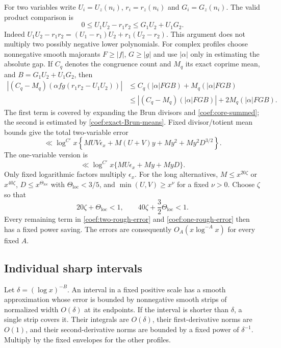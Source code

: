 For two variables write $U_i=U_z(n_i)$, $r_i=r_z(n_i)$ and
$G_i=G_z(n_i)$.  The valid product comparison is
\begin{equation}
 0\le U_1U_2-r_1r_2\le G_1U_2+U_1G_2.
 \label{coef:rough-product-gap}
\end{equation}
Indeed $U_1U_2-r_1r_2=(U_1-r_1)U_2+r_1(U_2-r_2)$.
This argument does not multiply two possibly negative lower polynomials.
For complex profiles choose nonnegative smooth majorants $F\ge|f|$,
$G\ge|g|$ and use $|\alpha|$ only in estimating the absolute gap.
If $C_q$ denotes the congruence count and $M_q$ its exact coprime mean,
and $B=G_1U_2+U_1G_2$, then
\begin{align*}
 |(C_q-M_q)(\alpha fg(r_1r_2-U_1U_2))|
 &\le C_q(|\alpha|FGB)+M_q(|\alpha|FGB)\\
 &\le |(C_q-M_q)(|\alpha|FGB)|+2M_q(|\alpha|FGB).
\end{align*}
The first term is covered by expanding the Brun divisors and
\eqref{coef:core-summed}; the second is estimated by
\eqref{coef:exact-Brun-means}.  Fixed divisor/totient mean bounds give
the total two-variable error
\begin{equation}
 \ll\log^{C'}x\left\{
 MUV\epsilon_x+M(U+V)y+My^2+My^2D^{3/2}\right\}.
 \label{coef:two-rough-error}
\end{equation}
The one-variable version is
\begin{equation}
 \ll\log^{C'}x\{MU\epsilon_x+My+MyD\}.
 \label{coef:one-rough-error}
\end{equation}
Only fixed logarithmic factors multiply $\epsilon_x$.
For the long alternatives, $M\le x^{20\zeta}$ or $x^{40\zeta}$,
$D\le x^{\Theta_{\mathrm{loc}}}$ with $\Theta_{\mathrm{loc}}<3/5$,
and $\min(U,V)\ge x^\nu$ for a fixed $\nu>0$.
Choose $\zeta$ so that
\[
 20\zeta+\Theta_{\mathrm{loc}}<1,\qquad
 40\zeta+\frac32\Theta_{\mathrm{loc}}<1.
\]
Every remaining term in \eqref{coef:two-rough-error} and
\eqref{coef:one-rough-error} then has a fixed power saving.
The errors are consequently $O_A(x\log^{-A}x)$ for every fixed $A$.

\subsection{Individual sharp intervals}

Let $\delta=(\log x)^{-B}$.  An interval in a fixed positive scale has
a smooth approximation whose error is bounded by nonnegative smooth
strips of normalized width $O(\delta)$ at its endpoints.  If the interval
is shorter than $\delta$, a single strip covers it.  Their integrals
are $O(\delta)$, their first-derivative norms are $O(1)$, and their
second-derivative norms are bounded by a fixed power of $\delta^{-1}$.
Multiply by the fixed envelopes for the other profiles.

